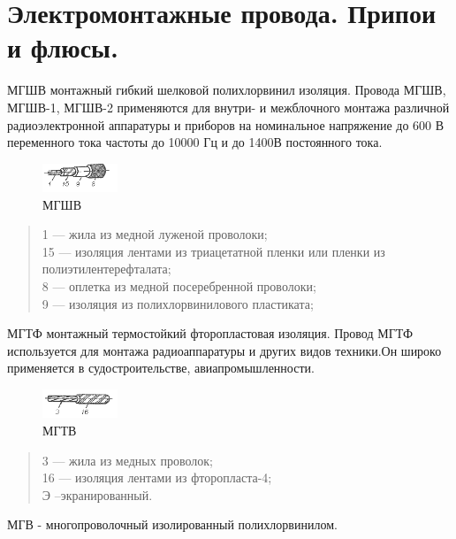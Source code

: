 \documentclass[unicode, 12pt, a4paper, oneside]{article}
\begin{document}
\section{Электромонтажные провода. Припои и флюсы.}

МГШВ монтажный гибкий шелковой полихлорвинил изоляция. Провода МГШВ, МГШВ-1, МГШВ-2 применяются для внутри- и межблочного монтажа различной радиоэлектронной аппаратуры и приборов на номинальное напряжение до 600 В переменного тока частоты до 10000 Гц и до 1400В постоянного тока.

\begin{figure}[H]
\centering
\includegraphics[width=0.2\textwidth]{76_MGSHV.png}
\caption{МГШВ}
\end{figure}

\begin{verse}
1 — жила из медной луженой проволоки;\\
15 — изоляция лентами из триацетатной пленки или пленки из полиэтилентерефталата;\\ 
8 — оплетка из медной посеребренной проволоки;\\ 
9 — изоляция из полихлорвинилового пластиката;\\
\end{verse}

МГТФ монтажный термостойкий фторопластовая изоляция. Провод МГТФ используется для монтажа радиоаппаратуры и других видов техники.Он широко применяется в судостроительстве, авиапромышленности.

\begin{figure}[H]
\centering
\includegraphics[width=0.2\textwidth]{76_MGTV.png}
\caption{МГТВ}
\end{figure}

\begin{verse}
3 — жила из медных проволок;\\ 
16 — изоляция лентами из фторопласта-4;\\
Э –экранированный.\\
\end{verse}

МГВ - многопроволочный  изолированный полихлорвинилом.
\end{document}
